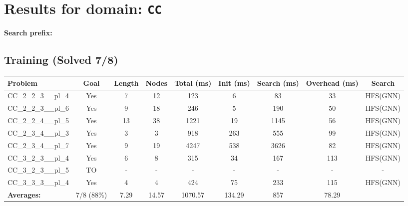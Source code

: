 \documentclass{article}
\begin{document}
\section*{Results for domain: \texttt{CC}}
\textbf{Search prefix:} 
\\[0.5cm]
\subsection*{Training (Solved 7/8)}
\begin{tabular}{lcccccccc}
\toprule
Problem & Goal & Length & Nodes & Total (ms) & Init (ms) & Search (ms) & Overhead (ms) & Search \\
\midrule
CC\_2\_2\_3\_\_pl\_4 & Yes & 7 & 12 & 123 & 6 & 83 & 33 & HFS(GNN) \\
CC\_2\_2\_3\_\_pl\_6 & Yes & 9 & 18 & 246 & 5 & 190 & 50 & HFS(GNN) \\
CC\_2\_2\_4\_\_pl\_5 & Yes & 13 & 38 & 1221 & 19 & 1145 & 56 & HFS(GNN) \\
CC\_2\_3\_4\_\_pl\_3 & Yes & 3 & 3 & 918 & 263 & 555 & 99 & HFS(GNN) \\
CC\_2\_3\_4\_\_pl\_7 & Yes & 9 & 19 & 4247 & 538 & 3626 & 82 & HFS(GNN) \\
CC\_3\_2\_3\_\_pl\_4 & Yes & 6 & 8 & 315 & 34 & 167 & 113 & HFS(GNN) \\
CC\_3\_2\_3\_\_pl\_5 & TO & - & - & - & - & - & - & - \\
CC\_3\_3\_3\_\_pl\_4 & Yes & 4 & 4 & 424 & 75 & 233 & 115 & HFS(GNN) \\
\textbf{Averages:} & 7/8 (88\%) & 7.29 & 14.57 & 1070.57 & 134.29 & 857 & 78.29 & \\
\bottomrule
\end{tabular}
\\[0.7cm]
\end{document}
